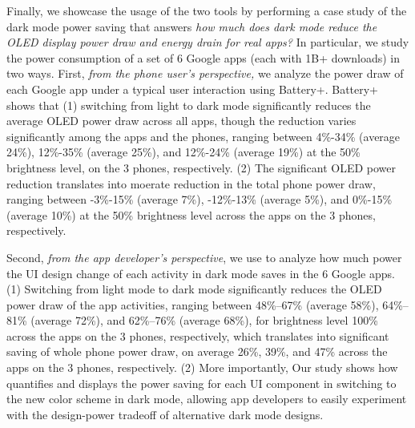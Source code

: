 
Finally, 
we showcase the usage of the two tools by performing a case study of the dark mode
power saving that answers {\em how much does dark mode reduce the
  OLED display power draw and energy drain for real apps?}  In
particular, we study the power consumption of a set of 6
 Google apps {(each with 1B+ downloads)} in two ways.  First, {\em from the phone user's
  perspective,} we analyze the power draw of each Google app under a
typical user interaction using Battery+.
Battery+ shows that (1) switching from light to dark mode
significantly reduces the average OLED power draw across all apps,
though the reduction varies significantly among the apps and the phones, ranging
between 4\%-34\% (average 24\%), 12\%-35\% (average 25\%), and
12\%-24\% (average 19\%) at the 50\% brightness level,
on the 3 phones, respectively.  (2) The significant OLED power reduction
translates into moerate reduction in the total phone power draw, ranging between
-3\%-15\% (average 7\%),
-12\%-13\% (average 5\%),
and 0\%-15\% (average 10\%) at the 50\% brightness level
across the apps on the 3 phones, respectively.

Second, {\em from the app developer's perspective}, we use \name to analyze how
much power the UI design change of each activity in dark mode saves in
the 6 Google apps.
(1) Switching from light mode to dark mode significantly reduces the OLED power
draw of the app activities, ranging between 48\%--67\% (average 58\%),
64\%--81\% (average 72\%), and 62\%--76\% (average 68\%),
for brightness level 100\% across the apps on the 3 phones, respectively,
which translates into significant saving of whole phone power draw,
on average 26\%, 39\%, and 47\% across the apps on the 3 phones, respectively.
(2) More importantly,
\fi
Our study shows how
\name quantifies and displays the power saving for each UI component
in switching to the new color scheme in dark mode, allowing app developers
to easily experiment with the design-power tradeoff of
alternative dark mode designs.

